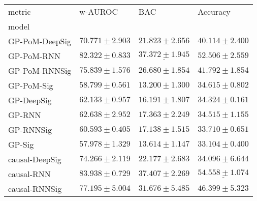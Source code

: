 \begin{tabular}{llll}
\toprule
metric &                                        w-AUROC &                                            BAC &                                       Accuracy \\
model          &                                                &                                                &                                                \\
\midrule
GP-PoM-DeepSig &                           $ 70.771 \pm 2.903 $ &                           $ 21.823 \pm 2.656 $ &                           $ 40.114 \pm 2.400 $ \\
GP-PoM-RNN     &                           $ 82.322 \pm 0.833 $ &            $  \underline{ 37.372 \pm 1.945 } $ &                           $ 52.506 \pm 2.559 $ \\
GP-PoM-RNNSig  &                           $ 75.839 \pm 1.576 $ &                           $ 26.680 \pm 1.854 $ &                           $ 41.792 \pm 1.854 $ \\
GP-PoM-Sig     &                           $ 58.799 \pm 0.561 $ &                           $ 13.200 \pm 1.300 $ &                           $ 34.615 \pm 0.802 $ \\
GP-DeepSig     &                           $ 62.133 \pm 0.957 $ &                           $ 16.191 \pm 1.807 $ &                           $ 34.324 \pm 0.161 $ \\
GP-RNN         &                           $ 62.638 \pm 2.952 $ &                           $ 17.363 \pm 2.249 $ &                           $ 34.515 \pm 1.155 $ \\
GP-RNNSig      &                           $ 60.593 \pm 0.405 $ &                           $ 17.138 \pm 1.515 $ &                           $ 33.710 \pm 0.651 $ \\
GP-Sig         &                           $ 57.978 \pm 1.329 $ &                           $ 13.614 \pm 1.147 $ &                           $ 33.104 \pm 0.400 $ \\
causal-DeepSig &                           $ 74.266 \pm 2.119 $ &                           $ 22.177 \pm 2.683 $ &                           $ 34.096 \pm 6.644 $ \\
causal-RNN     &               $  \mathbf{ 83.938 \pm 0.729 } $ &               $  \mathbf{ 37.407 \pm 2.269 } $ &  $  \mathbf{ \underline{ 54.558 \pm 1.074 }} $ \\
causal-RNNSig  &                           $ 77.195 \pm 5.004 $ &                           $ 31.676 \pm 5.485 $ &                           $ 46.399 \pm 5.323 $ \\

\end{tabular}
